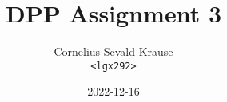 \documentclass{article}
\begin{document}
\title{DPP Assignment 3}
\author{Cornelius Sevald-Krause \\ \texttt{<lgx292>}}
\date{2022-12-16}
\maketitle
\end{document}
